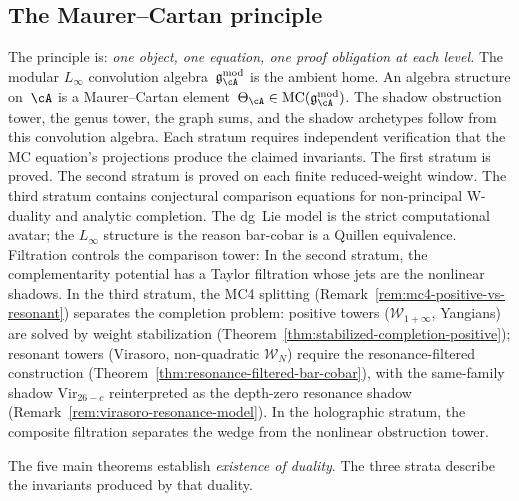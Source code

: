 \subsection*{The Maurer--Cartan principle}
The principle is:
\emph{one object, one equation, one proof obligation
at each level.}
The modular $L_\infty$ convolution
algebra~$\mathfrak{g}_\cA^{\mathrm{mod}}$ is the ambient
home. An algebra structure on~$\cA$ is a Maurer--Cartan
element~$\Theta_\cA \in
\mathrm{MC}(\mathfrak{g}_\cA^{\mathrm{mod}})$.
The shadow obstruction tower, the genus tower, the graph sums, and
the shadow archetypes follow from this convolution algebra. Each
stratum requires independent verification that the MC equation's
projections produce the claimed invariants. The first stratum is
proved. The second stratum is proved on each finite reduced-weight
window. The third stratum contains conjectural comparison equations
for non-principal W-duality and analytic completion.
The dg~Lie model is the strict computational avatar;
the $L_\infty$ structure is the reason bar-cobar is a
Quillen equivalence.
Filtration controls the comparison tower:
In the second stratum, the complementarity potential has a Taylor filtration
whose jets are the nonlinear shadows. In the third stratum, the MC4 splitting
(Remark~\ref{rem:mc4-positive-vs-resonant}) separates
the completion problem:
positive towers ($\mathcal{W}_{1+\infty}$, Yangians) are
solved by weight stabilization
(Theorem~\ref{thm:stabilized-completion-positive});
resonant towers (Virasoro, non-quadratic $\mathcal{W}_N$) require the
resonance-filtered construction
(Theorem~\ref{thm:resonance-filtered-bar-cobar}),
with the same-family shadow $\mathrm{Vir}_{26-c}$ reinterpreted as
the depth-zero resonance shadow
(Remark~\ref{rem:virasoro-resonance-model}).
In the holographic stratum,
the composite filtration separates the wedge from the nonlinear
obstruction tower.

The five main theorems establish \emph{existence of duality}.
The three strata describe the invariants produced by that duality.

